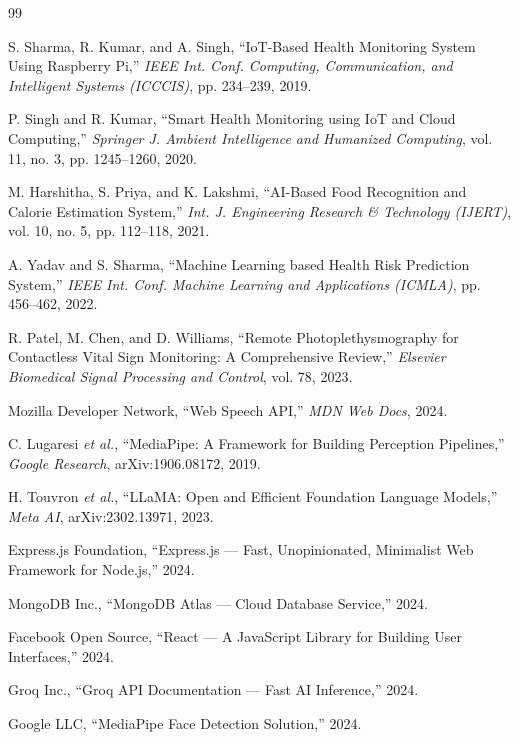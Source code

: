 \documentclass[12pt,a4paper]{report}
\begin{document}
\begin{thebibliography}{99}

S. Sharma, R. Kumar, and A. Singh, ``IoT-Based Health Monitoring System Using Raspberry Pi,'' \textit{IEEE Int. Conf. Computing, Communication, and Intelligent Systems (ICCCIS)}, pp. 234--239, 2019.

P. Singh and R. Kumar, ``Smart Health Monitoring using IoT and Cloud Computing,'' \textit{Springer J. Ambient Intelligence and Humanized Computing}, vol. 11, no. 3, pp. 1245--1260, 2020.

M. Harshitha, S. Priya, and K. Lakshmi, ``AI-Based Food Recognition and Calorie Estimation System,'' \textit{Int. J. Engineering Research \& Technology (IJERT)}, vol. 10, no. 5, pp. 112--118, 2021.

A. Yadav and S. Sharma, ``Machine Learning based Health Risk Prediction System,'' \textit{IEEE Int. Conf. Machine Learning and Applications (ICMLA)}, pp. 456--462, 2022.

R. Patel, M. Chen, and D. Williams, ``Remote Photoplethysmography for Contactless Vital Sign Monitoring: A Comprehensive Review,'' \textit{Elsevier Biomedical Signal Processing and Control}, vol. 78, 2023.

Mozilla Developer Network, ``Web Speech API,'' \textit{MDN Web Docs}, 2024.

C. Lugaresi \textit{et al.}, ``MediaPipe: A Framework for Building Perception Pipelines,'' \textit{Google Research}, arXiv:1906.08172, 2019.

H. Touvron \textit{et al.}, ``LLaMA: Open and Efficient Foundation Language Models,'' \textit{Meta AI}, arXiv:2302.13971, 2023.

Express.js Foundation, ``Express.js --- Fast, Unopinionated, Minimalist Web Framework for Node.js,'' 2024.

MongoDB Inc., ``MongoDB Atlas --- Cloud Database Service,'' 2024.

Facebook Open Source, ``React --- A JavaScript Library for Building User Interfaces,'' 2024.

Groq Inc., ``Groq API Documentation --- Fast AI Inference,'' 2024.

Google LLC, ``MediaPipe Face Detection Solution,'' 2024.


\end{thebibliography}
\end{document}
